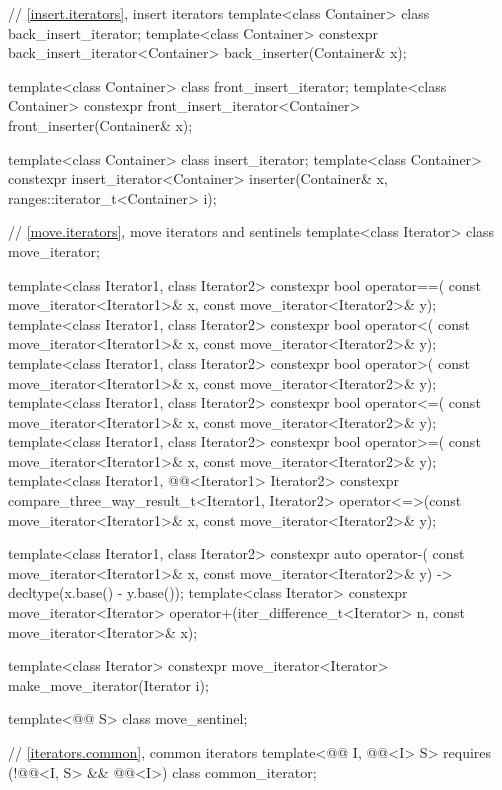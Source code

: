 \begin{codeblock}
{  // \ref{insert.iterators}, insert iterators
  template<class Container> class back_insert_iterator;
  template<class Container>
    constexpr back_insert_iterator<Container> back_inserter(Container& x);

  template<class Container> class front_insert_iterator;
  template<class Container>
    constexpr front_insert_iterator<Container> front_inserter(Container& x);

  template<class Container> class insert_iterator;
  template<class Container>
    constexpr insert_iterator<Container>
      inserter(Container& x, ranges::iterator_t<Container> i);

  // \ref{move.iterators}, move iterators and sentinels
  template<class Iterator> class move_iterator;

  template<class Iterator1, class Iterator2>
    constexpr bool operator==(
      const move_iterator<Iterator1>& x, const move_iterator<Iterator2>& y);
  template<class Iterator1, class Iterator2>
    constexpr bool operator<(
      const move_iterator<Iterator1>& x, const move_iterator<Iterator2>& y);
  template<class Iterator1, class Iterator2>
    constexpr bool operator>(
      const move_iterator<Iterator1>& x, const move_iterator<Iterator2>& y);
  template<class Iterator1, class Iterator2>
    constexpr bool operator<=(
      const move_iterator<Iterator1>& x, const move_iterator<Iterator2>& y);
  template<class Iterator1, class Iterator2>
    constexpr bool operator>=(
      const move_iterator<Iterator1>& x, const move_iterator<Iterator2>& y);
  template<class Iterator1, @@<Iterator1> Iterator2>
    constexpr compare_three_way_result_t<Iterator1, Iterator2>
      operator<=>(const move_iterator<Iterator1>& x,
                  const move_iterator<Iterator2>& y);

  template<class Iterator1, class Iterator2>
    constexpr auto operator-(
      const move_iterator<Iterator1>& x, const move_iterator<Iterator2>& y)
        -> decltype(x.base() - y.base());
  template<class Iterator>
    constexpr move_iterator<Iterator>
      operator+(iter_difference_t<Iterator> n, const move_iterator<Iterator>& x);

  template<class Iterator>
    constexpr move_iterator<Iterator> make_move_iterator(Iterator i);

  template<@@ S> class move_sentinel;

  // \ref{iterators.common}, common iterators
  template<@@ I, @@<I> S>
    requires (!@@<I, S> && @@<I>)
      class common_iterator;

}
\end{codeblock}
